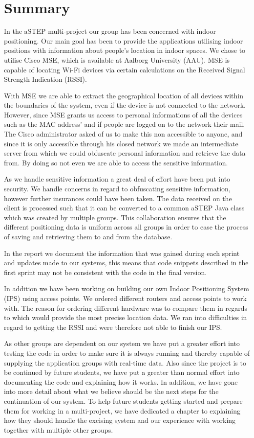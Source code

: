 \chapter*{Summary}
In the aSTEP multi-project our group has been concerned with indoor positioning. Our main goal has been to provide the applications utilising indoor positions with information about people's location in indoor spaces. We chose to utilise Cisco MSE, which is available at Aalborg University (AAU). MSE is capable of locating Wi-Fi devices via certain calculations on the Received Signal Strength Indication (RSSI).

With MSE we are able to extract the geographical location of all devices within the boundaries of the system, even if the device is not connected to the network. However, since MSE grants us access to personal informations of all the devices such as the MAC address' and if people are logged on to the network their mail. The Cisco administrator asked of us to make this non accessible to anyone, and since it is only accessible through his closed network we made an intermediate server from which we could obfuscate personal information and retrieve the data from. By doing so not even we are able to access the sensitive information. 

As we handle sensitive information a great deal of effort have been put into security. We handle concerns in regard to obfuscating sensitive information, however further insurances could have been taken.
The data received on the client is processed such that it can be converted to a common aSTEP Java class which was created by multiple groups. This collaboration ensures that the different positioning data is uniform across all groups in order to ease the process of saving and retrieving them to and from the database.

In the report we document the information that was gained during each sprint and updates made to our systems, this means that code snippets described in the first sprint may not be consistent with the code in the final version.

In addition we have been working on building our own Indoor Positioning System (IPS) using access points. We ordered different routers and access points to work with. The reason for ordering different hardware was to compare them in regards to which would provide the most precise location data. We ran into difficulties in regard to getting the RSSI and were therefore not able to finish our IPS.

As other groups are dependent on our system we have put a greater effort into testing the code in order to make sure it is always running and thereby capable of supplying the application groups with real-time data.
Also since the project is to be continued by future students, we have put a greater than normal effort into documenting the code and explaining how it works. In addition, we have gone into more detail about what we believe should be the next steps for the continuation of our system.
To help future students getting started and prepare them for working in a multi-project, we have dedicated a chapter to explaining how they should handle the excising system and our experience with working together with multiple other groups. 